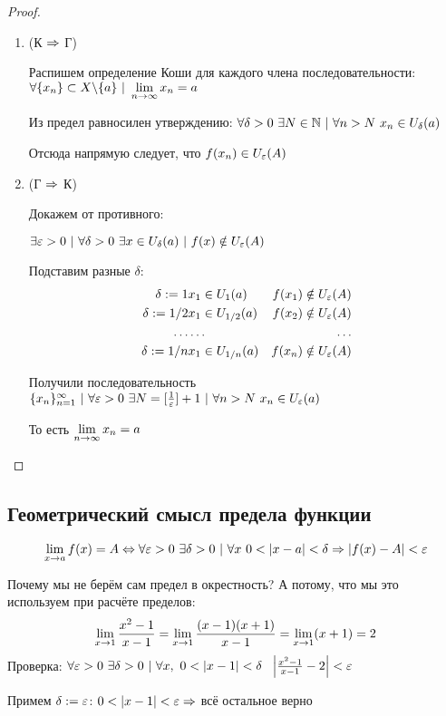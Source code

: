 \begin{proof}
	\begin{enumerate}
		\item (К $\Rightarrow$ Г)
		
		Распишем определение Коши для каждого члена последовательности: $\forall \{x_n\} \subset X \backslash \{a\}\ |\  \lim\limits_{n \rightarrow \infty} x_n = a$
		
		Из предел равносилен утверждению: $\forall \delta > 0\ \exists N \in \mathbb{N}\ |\ \forall n > N\ x_n \in U_{\delta}(a)$
		
		Отсюда напрямую следует, что $f(x_n) \in U_{\varepsilon}(A)$
		
		\item (Г $\Rightarrow$ К)
		
		Докажем от противного:
		
		$\exists \varepsilon > 0\ |\ \forall \delta > 0\ \exists x \in U_{\delta}(a)\ |\ f(x) \notin U_{\varepsilon}(A)$
		
		Подставим разные $\delta$:
		\begin{align*}
			\delta := 1 & x_1 \in U_{1}(a) & f(x_1) \notin U_{\varepsilon}(A)
			\\
			\delta := 1/2 & x_1 \in U_{1/2}(a) & f(x_2) \notin U_{\varepsilon}(A)
			\\
			\dots & \dots & \dots
			\\
			\delta := 1/n & x_1 \in U_{1/n}(a) & f(x_n) \notin U_{\varepsilon}(A)
		\end{align*}
		
		Получили последовательность $\{x_n\}_{n = 1}^\infty\ |\ \forall \eps > 0\ \exists N = [\frac{1}{\eps}] + 1\ |\ \forall n > N\ x_n \in U_{\eps}(a)$
		
		То есть $\lim\limits_{n \rightarrow \infty} x_n = a$
	\end{enumerate}
\end{proof}

\subsection{Геометрический смысл предела функции}

$$
	\lim\limits_{x \rightarrow a} f(x) = A \Leftrightarrow \forall \varepsilon > 0\ \exists \delta > 0\ |\ \forall x\ 0 < |x - a| < \delta \Rightarrow |f(x) - A| < \varepsilon
$$


\begin{example}
	Почему мы не берём сам предел в окрестность? А потому, что мы это используем при расчёте пределов:
	$$
		\lim\limits_{x \rightarrow 1} \frac{x^2 - 1}{x - 1} = \lim\limits_{x \rightarrow 1} \frac{(x - 1)(x + 1)}{x - 1} = \lim\limits_{x \rightarrow 1} (x + 1) = 2
	$$
	Проверка:
	$\forall \eps > 0\ \exists \delta > 0\ |\ \forall x,\ 0 < |x - 1| < \delta\ \ \left|\frac{x^2 - 1}{x - 1} - 2\right| < \eps$
	
	Примем $\delta := \varepsilon$: $0 < |x - 1| < \varepsilon \Rightarrow $ всё остальное верно
\end{example}

